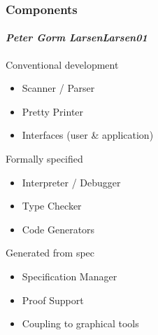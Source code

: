 \documentclass[slidestop,uncompress,mathserif,notes]{beamer}
\newcommand{\pgl}[1]{Peter Gorm Larsen}
\begin{document}

\begin{frame}
  \frametitle{Components}
  \framesubtitle{\emph{\pgl \cite{Larsen01}}}

  \begin{block}{Conventional development}
	{\scriptsize \begin{itemize}
		\item Scanner / Parser
		\item Pretty Printer
		\item Interfaces (user \& application)
	  \end{itemize}}
  \end{block}
%
  \begin{block}{Formally specified}
	{\scriptsize \begin{itemize}
	  \item Interpreter / Debugger
	  \item Type Checker
	  \item Code Generators
	\end{itemize}}
  \end{block}
% 
  \begin{block}{Generated from spec}
	{\scriptsize \begin{itemize}
		\item Specification Manager
		\item Proof Support
		\item Coupling to graphical tools
	  \end{itemize}}
  \end{block}
\end{frame}
\end{document}
